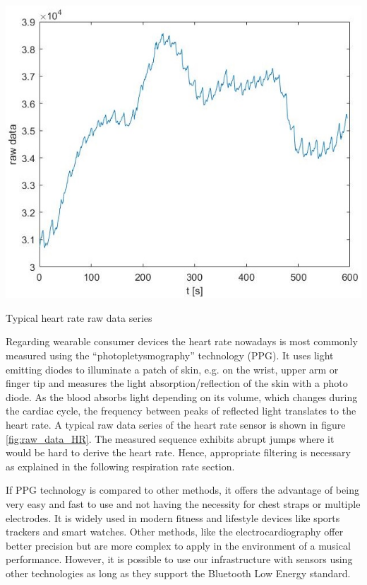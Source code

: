 \documentclass{sigchi-ext}
\begin{document}
\begin{marginfigure}[-10pc]
  \begin{minipage}{\marginparwidth}
    \centering
    \includegraphics[width=\marginparwidth]{figures/raw_data_heartrate}
    \caption{Typical heart rate raw data series}
    \label{fig:raw_data_HR}
  \end{minipage}
\end{marginfigure}

Regarding wearable consumer devices the heart rate nowadays is most commonly measured using the ``photopletysmography'' technology 
(PPG). It uses light emitting diodes to illuminate a patch of skin, e.g. on the wrist, upper arm
or finger tip and measures the light absorption/reflection of the skin with a photo diode. As the blood absorbs light depending on
its volume, which changes during the cardiac cycle, the frequency between peaks of reflected light translates to the heart rate.
A typical raw data series of the heart rate sensor is shown in figure \ref{fig:raw_data_HR}. The measured sequence exhibits abrupt 
jumps where it would be hard to derive the heart rate. Hence, appropriate filtering is necessary as explained in the following 
respiration rate section.

If PPG technology is compared to other methods, it offers the advantage of being very easy and fast
to use and not having the necessity for chest straps or multiple electrodes. It is widely used
in modern fitness and lifestyle devices like sports trackers and smart watches. Other methods,
like the electrocardiography offer better precision but are more complex to apply in the
environment of a musical performance. However, it is possible to use our infrastructure with sensors using other technologies
as long as they support the Bluetooth Low Energy standard.
\end{document}
